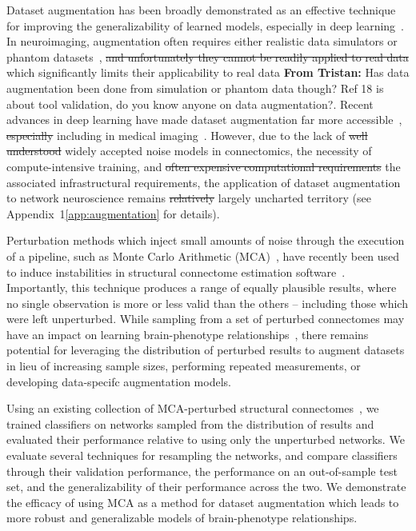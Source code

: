 \documentclass[10pt]{SelfArx} %
\newcommand{\tristan}[1]{\colorlet{saved}{.}\color{orange}\textbf{From Tristan:} #1\color{saved}\xspace}
\newcommand{\tristanmod}[2]{\colorlet{saved}{.}\color{orange}\sout{#1} #2\color{black}\xspace\color{saved}}
\newcommand{\new}[1]{\color{blue}#1\color{black}\xspace}
\begin{document}
\new{Dataset augmentation has been broadly demonstrated as an effective technique for improving the generalizability of
learned models, especially in deep learning~\cite{nalepa2019data}. In neuroimaging, augmentation often requires either
realistic data simulators or phantom datasets~\cite{graham2016realistic}, \tristanmod{and unfortunately they cannot be readily
applied to real data}{which significantly limits their applicability to
real data} \tristan{Has data augmentation been done from simulation or
phantom data though? Ref 18 is about tool validation, do you know anyone on
data augmentation?}. Recent advances in deep learning have made dataset
augmentation far more
accessible~\cite{shorten2019survey}, \tristanmod{especially}{including} in
medical imaging~\cite{yi2019generative,barile2021data}. However, due to the lack of
\tristanmod{well understood}{widely accepted} noise models in connectomics,
the necessity of \tristanmod{}{compute-intensive} training, and
\tristanmod{often expensive computational requirements}{the associated
infrastructural requirements}, the application of dataset augmentation to
network neuroscience remains \tristanmod{relatively}{largely} uncharted
territory (see Appendix~1\ref{app:augmentation} for details).}

Perturbation methods which inject small amounts of noise through the execution of a pipeline, such as Monte Carlo
Arithmetic (MCA)~\cite{Parker1997-qq,Denis2016-wo}, have recently been used to induce instabilities in structural
connectome estimation software~\cite{Kiar2020-lb}. Importantly, this technique produces a range of equally plausible
results, where no single observation is more or less valid than the others – including those which were left
unperturbed. While sampling from a set of perturbed connectomes may have an impact on learning brain-phenotype
relationships~\cite{Kiar2020-kz}, there remains potential for leveraging the distribution of perturbed results to
augment datasets in lieu of increasing sample sizes, performing repeated measurements, \new{or developing data-specifc
augmentation models}.

Using an existing collection of MCA-perturbed structural connectomes~\cite{Kiar2020-yz}, we trained classifiers on
networks sampled from the distribution of results and evaluated their performance relative to using only the
unperturbed networks. We evaluate several techniques for resampling the networks, and compare classifiers through their
validation performance, the performance on an out-of-sample test set, and the generalizability of their performance
across the two. We demonstrate the efficacy of using MCA as a method for dataset augmentation which leads to more
robust and generalizable models of brain-phenotype relationships.
\end{document}
